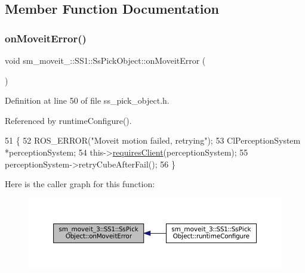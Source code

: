\subsection{Member Function Documentation}
\mbox{\label{structsm__moveit__3_1_1SS1_1_1SsPickObject_ab2cf544834abb6a7b9032f58c228c12c}} 
\subsubsection{\texorpdfstring{on\+Moveit\+Error()}{onMoveitError()}}
{\footnotesize\ttfamily void sm\+\_\+moveit\+\_\+::\+S\+S1\+::\+Ss\+Pick\+Object\+::on\+Moveit\+Error (\begin{DoxyParamCaption}{ }\end{DoxyParamCaption})\hspace{0.3cm}{\ttfamily [inline]}}



Definition at line 50 of file ss\+\_\+pick\+\_\+object.\+h.



Referenced by runtime\+Configure().


\begin{DoxyCode}
51     \{
52         ROS\_ERROR(\textcolor{stringliteral}{"Moveit motion failed, retrying"});
53         ClPerceptionSystem *perceptionSystem;
54         this->\hyperlink{classsmacc_1_1ISmaccState_a7f95c9f0a6ea2d6f18d1aec0519de4ac}{requiresClient}(perceptionSystem);
55         perceptionSystem->retryCubeAfterFail();
56     \}
\end{DoxyCode}
Here is the caller graph for this function\+:
\nopagebreak
\begin{figure}[H]
\begin{center}
\leavevmode
\includegraphics[width=350pt]{structsm__moveit__3_1_1SS1_1_1SsPickObject_ab2cf544834abb6a7b9032f58c228c12c_icgraph}
\end{center}
\end{figure}
\mbox{\label{structsm__moveit__3_1_1SS1_1_1SsPickObject_ab6c69d020a7630c4b8a81fc4241a33f0}} 
